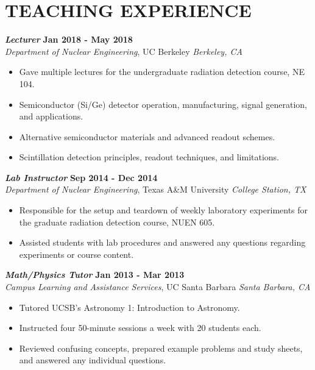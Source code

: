 \section{\small{TEACHING EXPERIENCE}}

{\sl\bf Lecturer} \hfill {\bf Jan 2018 - May 2018} \\
{\sl Department of Nuclear Engineering}, UC Berkeley \hfill {\sl Berkeley, CA}\\[-2.8ex]
\vspace{2pt}
\begin{itemize}[leftmargin=4ex] \itemsep -2pt
\item Gave multiple lectures for the undergraduate radiation detection course, NE 104.
\item Semiconductor (Si/Ge) detector operation, manufacturing, signal generation, and applications.
\item Alternative semiconductor materials and advanced readout schemes.
\item Scintillation detection principles, readout techniques, and limitations.
\end{itemize} 

{\sl\bf Lab Instructor} \hfill {\bf Sep 2014 - Dec 2014} \\
{\sl Department of Nuclear Engineering}, Texas A\&M University \hfill {\sl College Station, TX}\\[-2.8ex]
\vspace{2pt}
\begin{itemize}[leftmargin=4ex] \itemsep -2pt
\item Responsible for the setup and teardown of weekly laboratory experiments for the graduate radiation detection course, NUEN 605.
\item Assisted students with lab procedures and answered any questions regarding experiments or course content.
\end{itemize} 

{\sl\bf Math/Physics Tutor} \hfill {\bf Jan 2013 - Mar 2013} \\
{\sl Campus Learning and Assistance Services}, UC Santa Barbara \hfill {\sl Santa Barbara, CA} \\[-2.8ex]
\vspace{2pt}
\begin{itemize}[leftmargin=4ex] \itemsep -2pt
\item Tutored UCSB's Astronomy 1: Introduction to Astronomy. 		
\item Instructed four 50-minute sessions a week with 20 students each.
\item Reviewed confusing concepts, prepared example problems and study sheets, and answered any individual questions.
\end{itemize} 